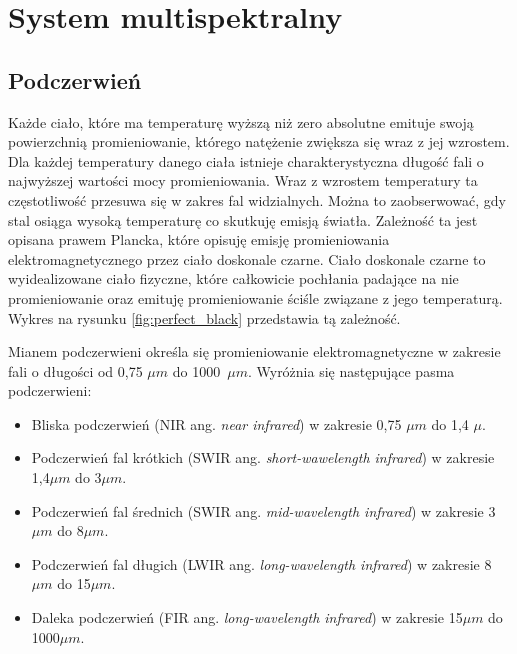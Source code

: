 \chapter{System multispektralny}
\label{cha:multispectral}


 
\section{Podczerwień}

Każde ciało, które ma temperaturę wyższą niż zero absolutne emituje swoją powierzchnią promieniowanie, którego natężenie zwiększa się wraz z jej wzrostem.
Dla każdej temperatury danego ciała istnieje charakterystyczna długość fali o najwyższej wartości mocy promieniowania. Wraz z wzrostem temperatury ta częstotliwość przesuwa się w zakres fal widzialnych. 
Można to zaobserwować, gdy stal osiąga wysoką temperaturę co skutkuję emisją światła. 
Zależność ta jest opisana prawem Plancka, które opisuję emisję promieniowania elektromagnetycznego przez ciało doskonale czarne. 
Ciało doskonale czarne to wyidealizowane ciało fizyczne, które całkowicie pochłania padające na nie promieniowanie oraz emituję promieniowanie ściśle związane z jego temperaturą.
Wykres na rysunku \ref{fig:perfect_black} przedstawia tą zależność. 

Mianem podczerwieni określa się promieniowanie elektromagnetyczne w zakresie fali o długości od 0,75 $\mu m$ do 1000~$\mu m$. Wyróżnia się następujące pasma podczerwieni:
\begin{itemize}
\item Bliska podczerwień (NIR ang. \textit{near infrared}) w zakresie 0,75 $\mu m$ do 1,4 $\mu$.
\item Podczerwień fal krótkich (SWIR ang. \textit{short-wawelength infrared}) w zakresie 1,4$\mu m$ do 3$\mu m$.
\item Podczerwień fal średnich (SWIR ang. \textit{mid-wavelength infrared}) w zakresie 3$\mu m$ do 8$\mu m$.
\item Podczerwień fal długich (LWIR ang. \textit{long-wavelength infrared}) w zakresie 8$\mu m$ do 15$\mu m$.
\item Daleka podczerwień (FIR ang. \textit{long-wavelength infrared}) w zakresie 15$\mu m$ do 1000$\mu m$.
\end{itemize}

